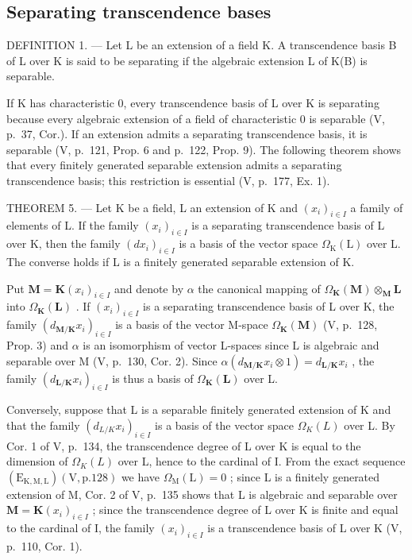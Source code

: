 \subsection{Separating transcendence bases}

DEFINITION 1. --- Let L be an extension of a field K. A transcendence basis B of L over K is said to be separating if the algebraic extension L of K(B) is separable.

If K has characteristic 0, every transcendence basis of L over K is separating because every algebraic extension of a field of characteristic 0 is separable (V, p.~37, Cor.). If an extension admits a separating transcendence basis, it is separable (V, p.~121, Prop. 6 and p.~122, Prop. 9). The following theorem shows that every finitely generated separable extension admits a separating transcendence basis; this restriction is essential (V, p.~177, Ex. 1).

THEOREM 5. --- Let K be a field, L an extension of K and \((x_{i})_{i\in I}\) a family of elements of L. If the family \((x_{i})_{i\in I}\) is a separating transcendence basis of L over K, then the family \((dx_{i})_{i\in I}\) is a basis of the vector space \(\Omega_{\mathrm{K}}(\mathrm{L})\) over L. The converse holds if L is a finitely generated separable extension of K.

Put \(\mathbf{M} = \mathbf{K}(x_i)_{i \in I}\) and denote by \(\alpha\) the canonical mapping of \(\Omega_{\mathbf{K}}(\mathbf{M}) \otimes_{\mathbf{M}} \mathbf{L}\) into \(\Omega_{\mathbf{K}}(\mathbf{L})\) . If \((x_i)_{i \in I}\) is a separating transcendence basis of L over K, the family \((d_{\mathbf{M}/\mathbf{K}} x_i)_{i \in I}\) is a basis of the vector M-space \(\Omega_{\mathbf{K}}(\mathbf{M})\) (V, p.~128, Prop. 3) and \(\alpha\) is an isomorphism of vector L-spaces since L is algebraic and separable over M (V, p.~130, Cor. 2). Since \(\alpha(d_{\mathbf{M}/\mathbf{K}} x_i \otimes 1) = d_{\mathbf{L}/\mathbf{K}} x_i\) , the family \((d_{\mathbf{L}/\mathbf{K}} x_i)_{i \in I}\) is thus a basis of \(\Omega_{\mathbf{K}}(\mathbf{L})\) over L.

Conversely, suppose that L is a separable finitely generated extension of K and that the family \((d_{L/K}x_{i})_{i\in I}\) is a basis of the vector space \(\Omega_{K}(L)\) over L. By Cor. 1 of V, p.~134, the transcendence degree of L over K is equal to the dimension of \(\Omega_{K}(L)\) over L, hence to the cardinal of I. From the exact sequence \((\mathrm{E}_{\mathrm{K},\mathrm{M},\mathrm{L}})(\mathrm{V},\mathrm{p}.128)\) we have \(\Omega_{\mathrm{M}}(\mathrm{L})=0\) ; since L is a finitely generated extension of M, Cor. 2 of V, p.~135 shows that L is algebraic and separable over \(\mathbf{M}=\mathbf{K}(x_{i})_{i\in I}\) ; since the transcendence degree of L over K is finite and equal to the cardinal of I, the family \((x_{i})_{i\in I}\) is a transcendence basis of L over K (V, p.~110, Cor. 1).

